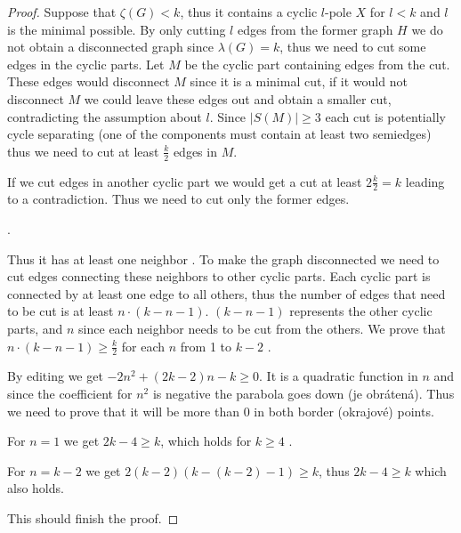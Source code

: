 \documentclass[12pt, twoside]{book}
\begin{document}
\begin{proof}
	
	Suppose that $\zeta(G)<k$, thus it contains a cyclic $l$-pole $X$ for $l<k$ and $l$ is the minimal possible. By only cutting $l$ edges from the former graph $H$ we do not obtain a disconnected graph since $\lambda(G)=k$, thus we need to cut some edges in the cyclic parts. Let $M$ be the cyclic part containing edges from the cut. These edges would disconnect $M$ since it is a minimal cut, if it would not disconnect $M$ we could leave these edges out and obtain a smaller cut, contradicting the assumption about $l$. Since $|S(M)|\geq 3$ each cut is potentially cycle separating (one of the components must contain at least two semiedges) thus we need to cut at least $\frac{k}{2}$ edges in $M$.
	
	If we cut edges in another cyclic part we would get a cut at least $2\frac{k}{2}=k$ leading to a contradiction. Thus we need to cut only the former edges.
	
	.
	
	Thus it has at least one neighbor . To make the graph disconnected we need to cut edges connecting these neighbors to other cyclic parts. Each cyclic part is connected by at least one edge to all others, thus the number of edges that need to be cut is at least $n\cdot (k-n-1)$. $(k-n-1)$ represents the other cyclic parts, and $n$ since each neighbor needs to be cut from the others. We prove that $n\cdot (k-n-1)\geq \frac{k}{2}$ for each $n$ from 1 to $k-2$ .
	
	By editing we get $-2n^2+(2k-2)n-k\geq 0$. It is a quadratic function in $n$ and since the coefficient for $n^2$ is negative the parabola goes down (je obrátená). Thus we need to prove that it will be more than 0 in both border (okrajové) points.
	
	For $n=1$ we get $2k-4\geq k$, which holds for $k\geq 4$ .
	
	For $n=k-2$ we get $2(k-2)(k-(k-2)-1)\geq k$, thus $2k-4\geq k$ which also holds.
	
	This should finish the proof.
\end{proof}
\end{document}
